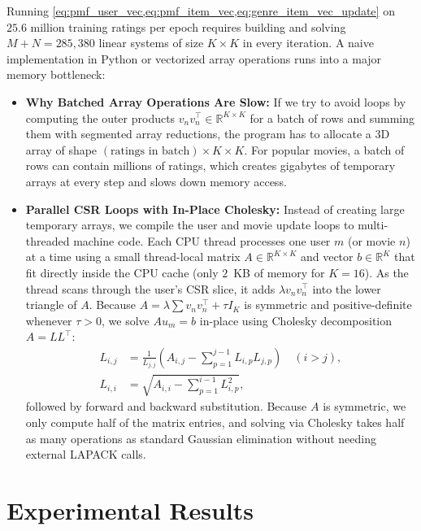 \documentclass{article}
\theoremstyle{plain}
\theoremstyle{definition}
\begin{document}
Running \cref{eq:pmf_user_vec,eq:pmf_item_vec,eq:genre_item_vec_update} on $25.6$ million training ratings per epoch requires building and solving $M + N = 285{,}380$ linear systems of size $K \times K$ in every iteration. A naive implementation in Python or vectorized array operations runs into a major memory bottleneck:
\begin{itemize}
    \item \textbf{Why Batched Array Operations Are Slow:} If we try to avoid loops by computing the outer products $v_n v_n^\top \in \mathbb{R}^{K \times K}$ for a batch of rows and summing them with segmented array reductions, the program has to allocate a 3D array of shape $(\text{ratings in batch}) \times K \times K$. For popular movies, a batch of rows can contain millions of ratings, which creates gigabytes of temporary arrays at every step and slows down memory access.
    \item \textbf{Parallel CSR Loops with In-Place Cholesky:} Instead of creating large temporary arrays, we compile the user and movie update loops to multi-threaded machine code. Each CPU thread processes one user $m$ (or movie $n$) at a time using a small thread-local matrix $A \in \mathbb{R}^{K \times K}$ and vector $b \in \mathbb{R}^K$ that fit directly inside the CPU cache (only $2$~KB of memory for $K=16$). As the thread scans through the user's CSR slice, it adds $\lambda v_n v_n^\top$ into the lower triangle of $A$. Because $A = \lambda \sum v_n v_n^\top + \tau I_K$ is symmetric and positive-definite whenever $\tau > 0$, we solve $A u_m = b$ in-place using Cholesky decomposition $A = L L^\top$:
    \begin{equation}
    \begin{aligned}
        L_{i,j} &= \frac{1}{L_{j,j}} \!\left(A_{i,j} - \sum_{p=1}^{j-1} L_{i,p} L_{j,p}\right) \quad (i > j), \\
        L_{i,i} &= \sqrt{A_{i,i} - \sum_{p=1}^{i-1} L_{i,p}^2},
    \end{aligned}
    \end{equation}
    followed by forward and backward substitution. Because $A$ is symmetric, we only compute half of the matrix entries, and solving via Cholesky takes half as many operations as standard Gaussian elimination without needing external LAPACK calls.
\end{itemize}

\section{Experimental Results}
\label{sec:experiments}
\end{document}
